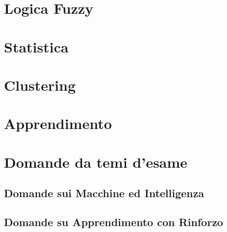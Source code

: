 \providecommand{\main}{.}


\newcommand{\graffe}[1]{\left\lbrace #1 \right\rbrace}

\setcounter{tocdepth}{2}






{\hypersetup{hidelinks}
  \tableofcontents  %
}

\chapter{Logica Fuzzy}


\chapter{Statistica}


\chapter{Clustering}


\chapter{Apprendimento}


\appendix
\chapter{Domande da temi d'esame}

\section{Domande sui Macchine ed Intelligenza}

\clearpage

\clearpage
\section{Domande su Apprendimento con Rinforzo}

\clearpage


